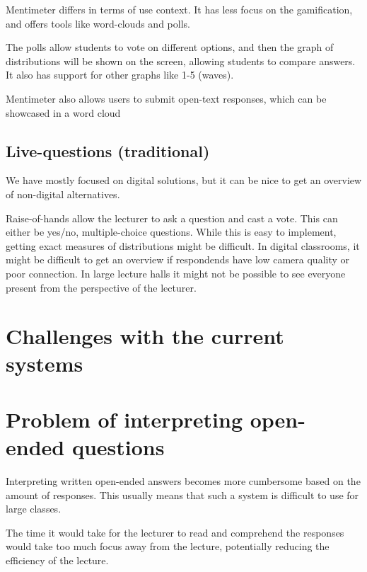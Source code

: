 Mentimeter differs in terms of use context. It has less focus on the gamification, and offers tools like word-clouds and polls.

The polls allow students to vote on different options, and then the graph of distributions will be shown on the screen, allowing students to compare answers. It also has support for other graphs like 1-5 (waves).

Mentimeter also allows users to submit open-text responses, which can be showcased in a word cloud

\subsection{Live-questions (traditional)}

We have mostly focused on digital solutions, but it can be nice to get an overview of non-digital alternatives.

Raise-of-hands allow the lecturer to ask a question and cast a vote. This can either be yes/no, multiple-choice questions. While this is easy to implement, getting exact measures of distributions might be difficult. In digital classrooms, it might be difficult to get an overview if respondends have low camera quality or poor connection. In large lecture halls it might not be possible to see everyone present from the perspective of the lecturer. 

\section{Challenges with the current systems}

\section{Problem of interpreting open-ended questions}
Interpreting written open-ended answers becomes more cumbersome based on the amount of responses. This usually means that such a system is difficult to use for large classes. 

The time it would take for the lecturer to read and comprehend the responses would take too much focus away from the lecture, potentially reducing the efficiency of the lecture. 

